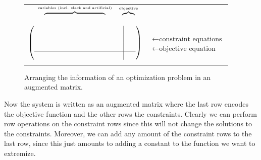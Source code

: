 \begin{figure}
\begin{center}
\begin{tabular}{ll}
\ \ %
{$\overbrace{\phantom{VERYVERYERY}}^{\mbox{\tiny variables (incl. slack and artificial)}}$}\ %
{$\overbrace{\phantom{F}}^{\mbox{\tiny objective}}$}&\\ %
{$
\left(
\begin{array}{c|c}
\phantom{VERYVERYERYFATS}&\phantom{S}\\
\\
\\\hline
\\
\end{array}
\right)
$} &{$\begin{array}{l} \\ \leftarrow  \mbox{constraint equations} \\[6mm] \leftarrow \mbox{objective equation}\end{array}$}\\ %
\hspace{4.3cm}{$\begin{array}{c}\uparrow\\ \mbox{objective value}\end{array}\!\!\!\!\!\!\!\!$} %
\end{tabular}
\end{center}
\caption{Arranging the information of an optimization problem in an augmented matrix.\label{augD}}
\end{figure}



Now the system is written as an augmented matrix where the last row encodes the objective function and the other rows the constraints. Clearly 
we can perform row operations on the constraint rows since this will not change the solutions to the constraints. 
Moreover, we can add any amount of the constraint rows to the last row,
since this just amounts to adding a constant to the function we want to extremize.


